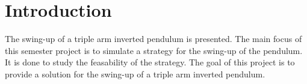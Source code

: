 \documentclass[
		twoside,openright,titlepage,numbers=noenddot,headinclude,%
	 	footinclude=true,cleardoublepage=empty,
		dottedtoc, %
		BCOR=5mm,paper=a4,fontsize=11pt, %
		ngerman,american, %
		]{scrreprt}
\begin{document}

\section{Introduction}
The swing-up of a triple arm inverted pendulum is presented. The main focus of this semester project is to simulate a strategy for the swing-up of the pendulum. It is done to study the feasability of the strategy.
The goal of this project is to provide a solution for the swing-up of a triple arm inverted pendulum.
\end{document}
